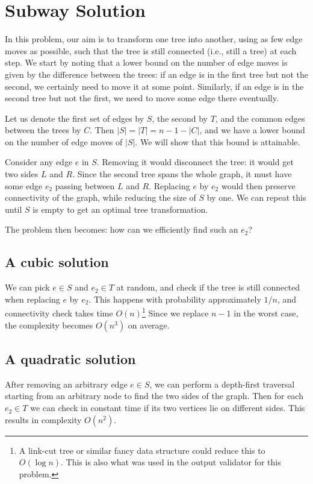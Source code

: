\documentclass{article}
\begin{document}
\section*{Subway Solution}
In this problem, our aim is to transform one tree into another, using as few edge moves as possible, such that the tree is still connected (i.e., still a tree) at each step.
We start by noting that a lower bound on the number of edge moves is given by the difference between the trees:
if an edge is in the first tree but not the second, we certainly need to move it at some point.
Similarly, if an edge is in the second tree but not the first, we need to move some edge there eventually.

Let us denote the first set of edges by $S$, the second by $T$, and the common edges between the trees by $C$. Then $|S| = |T| = n-1 - |C|$, and we have a lower bound on the number of
edge moves of $|S|$. We will show that this bound is attainable.

Consider any edge $e$ in $S$. Removing it would disconnect the tree: it would get two sides $L$ and $R$.
Since the second tree spans the whole graph, it must have some edge $e_2$ passing between $L$ and $R$.
Replacing $e$ by $e_2$ would then preserve connectivity of the graph, while reducing the size of $S$ by one.
We can repeat this until $S$ is empty to get an optimal tree transformation.

The problem then becomes: how can we efficiently find such an $e_2$?

\subsection*{A cubic solution}
We can pick $e \in S$ and $e_2 \in T$ at random, and check if the tree is still connected when replacing $e$ by $e_2$.
This happens with probability approximately $1/n$, and connectivity check takes time $O(n)$\footnote{A link-cut tree or similar fancy data structure could reduce this to $O(\log n)$. This is also what was used in the output validator for this problem.}
Since we replace $n-1$ in the worst case, the complexity becomes $O(n^3)$ on average.

\subsection*{A quadratic solution}
After removing an arbitrary edge $e \in S$, we can perform a depth-first traversal starting from an arbitrary node to find the two sides of the graph.
Then for each $e_2 \in T$ we can check in constant time if its two vertices lie on different sides. This results in complexity $O(n^2)$.
\end{document}
